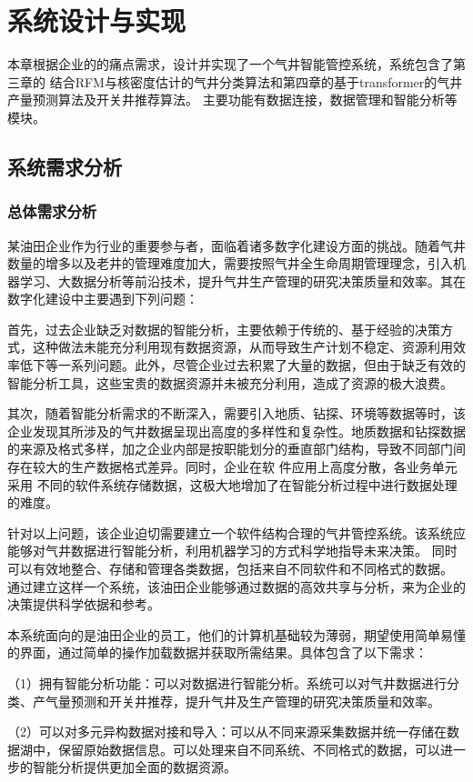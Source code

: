 \chapter{系统设计与实现}
本章根据企业的的痛点需求，设计并实现了一个气井智能管控系统，系统包含了第三章的
结合RFM与核密度估计的气井分类算法和第四章的基于transformer的气井产量预测算法及开关井推荐算法。
主要功能有数据连接，数据管理和智能分析等模块。
\section{系统需求分析}
\subsection{总体需求分析}
某油田企业作为行业的重要参与者，面临着诸多数字化建设方面的挑战。随着气井数量的增多以及老井的管理难度加大，需要按照气井全生命周期管理理念，引入机器学习、大数据分析等前沿技术，提升气井生产管理的研究决策质量和效率。其在数字化建设中主要遇到下列问题：

首先，过去企业缺乏对数据的智能分析，主要依赖于传统的、基于经验的决策方式，这种做法未能充分利用现有数据资源，从而导致生产计划不稳定、资源利用效率低下等一系列问题。此外，尽管企业过去积累了大量的数据，但由于缺乏有效的智能分析工具，这些宝贵的数据资源并未被充分利用，造成了资源的极大浪费。

其次，随着智能分析需求的不断深入，需要引入地质、钻探、环境等数据等时，该企业发现其所涉及的气井数据呈现出高度的多样性和复杂性。地质数据和钻探数据的来源及格式多样，加之企业内部是按职能划分的垂直部门结构，导致不同部门间存在较大的生产数据格式差异。同时，企业在软
件应用上高度分散，各业务单元采用
不同的软件系统存储数据，这极大地增加了在智能分析过程中进行数据处理的难度。

针对以上问题，该企业迫切需要建立一个软件结构合理的气井管控系统。该系统应能够对气井数据进行智能分析，利用机器学习的方式科学地指导未来决策。
同时可以有效地整合、存储和管理各类数据，包括来自不同软件和不同格式的数据。
通过建立这样一个系统，该油田企业能够通过数据的高效共享与分析，来为企业的决策提供科学依据和参考。

本系统面向的是油田企业的员工，他们的计算机基础较为薄弱，期望使用简单易懂的界面，通过简单的操作加载数据并获取所需结果。具体包含了以下需求：

（1）拥有智能分析功能：可以对数据进行智能分析。系统可以对气井数据进行分类、产气量预测和开关井推荐，提升气井及生产管理的研究决策质量和效率。

（2）可以对多元异构数据对接和导入：可以从不同来源采集数据并统一存储在数据湖中，保留原始数据信息。可以处理来自不同系统、不同格式的数据，可以进一步的智能分析提供更加全面的数据资源。


